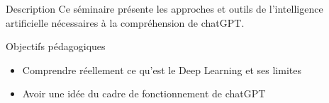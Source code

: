 
\begin{frame}{Description}
  Ce séminaire présente les approches et outils de l'intelligence artificielle nécessaires à la compréhension de chatGPT.
\end{frame}

\begin{frame}{Objectifs pédagogiques}
  \begin{itemize}
  \item Comprendre réellement ce qu'est le Deep Learning et ses limites
  \item Avoir une idée du cadre de fonctionnement de chatGPT
  \end{itemize}
\end{frame}

